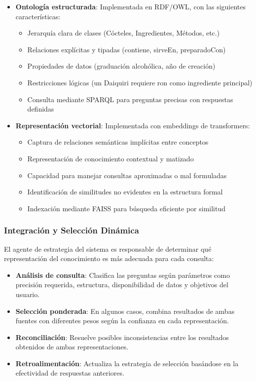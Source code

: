 \documentclass[runningheads]{llncs}
\begin{document}
\begin{itemize}
    \item \textbf{Ontología estructurada}: Implementada en RDF/OWL, con las siguientes características:
    \begin{itemize}
        \item Jerarquía clara de clases (Cócteles, Ingredientes, Métodos, etc.)
        \item Relaciones explícitas y tipadas (contiene, sirveEn, preparadoCon)
        \item Propiedades de datos (graduación alcohólica, año de creación)
        \item Restricciones lógicas (un Daiquiri requiere ron como ingrediente principal)
        \item Consulta mediante SPARQL para preguntas precisas con respuestas definidas
    \end{itemize}
    
    \item \textbf{Representación vectorial}: Implementada con embeddings de transformers:
    \begin{itemize}
        \item Captura de relaciones semánticas implícitas entre conceptos
        \item Representación de conocimiento contextual y matizado
        \item Capacidad para manejar consultas aproximadas o mal formuladas
        \item Identificación de similitudes no evidentes en la estructura formal
        \item Indexación mediante FAISS para búsqueda eficiente por similitud
    \end{itemize}
\end{itemize}

\subsubsection{Integración y Selección Dinámica}

El agente de estrategia del sistema es responsable de determinar qué representación del conocimiento es más adecuada para cada consulta:

\begin{itemize}
    \item \textbf{Análisis de consulta}: Clasifica las preguntas según parámetros como precisión requerida, estructura, disponibilidad de datos y objetivos del usuario.
    
    \item \textbf{Selección ponderada}: En algunos casos, combina resultados de ambas fuentes con diferentes pesos según la confianza en cada representación.
    
    \item \textbf{Reconciliación}: Resuelve posibles inconsistencias entre los resultados obtenidos de ambas representaciones.
    
    \item \textbf{Retroalimentación}: Actualiza la estrategia de selección basándose en la efectividad de respuestas anteriores.
\end{itemize}
\end{document}
